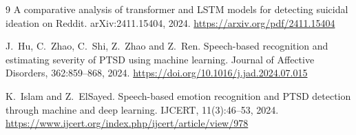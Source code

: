 \documentclass[11pt,a4paper]{article}
\begin{document}
\begin{thebibliography}{9}
A comparative analysis of transformer and LSTM models for detecting suicidal ideation on Reddit.
arXiv:2411.15404, 2024.
\url{https://arxiv.org/pdf/2411.15404}

J.~Hu, C.~Zhao, C.~Shi, Z.~Zhao and Z.~Ren.
Speech-based recognition and estimating severity of PTSD using machine learning.
Journal of Affective Disorders, 362:859--868, 2024.
\url{https://doi.org/10.1016/j.jad.2024.07.015}

K.~Islam and Z.~ElSayed.
Speech-based emotion recognition and PTSD detection through machine and deep learning.
IJCERT, 11(3):46--53, 2024.
\url{https://www.ijcert.org/index.php/ijcert/article/view/978}

\end{thebibliography}

\end{document}
